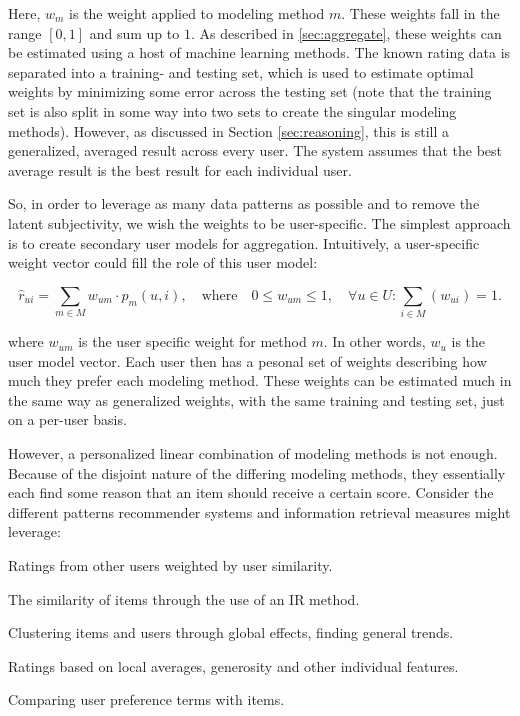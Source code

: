 Here, $w_m$ is the weight applied to modeling method $m$. These weights fall in the range $[0,1]$ and sum up to $1$.
As described in \ref{sec:aggregate}, these weights can be estimated using a host of machine learning methods.
The known rating data is separated into a training- and testing set, which is used to estimate optimal weights
by minimizing some error across the testing set 
(note that the training set is also split in some way into two sets to create the singular modeling methods).
However, as discussed in Section \ref{sec:reasoning},
this is still a generalized, averaged result across every user. 
The system assumes that the best average result is the best result for each individual user.

So, in order to leverage as many data patterns as possible and to remove the latent subjectivity,
we wish the weights to be user-specific. The simplest approach is to create secondary user models for aggregation.
Intuitively, a user-specific weight vector could fill the role of this user model:

\begin{equation*}
  \hat{r}_{ui} = \sum_{m \in M} w_{um} \cdot p_m(u,i),
  \quad \text{where} \quad 0 \leq w_{um} \leq 1, \quad \forall u \in U: \sum_{i \in M} (w_{ui}) = 1.
\end{equation*}

where $w_{um}$ is the user specific weight for method $m$. In other words, $w_{u}$ is the user model vector.
Each user then has a pesonal set of weights describing how much they prefer each modeling method.
These weights can be estimated much in the same way as generalized weights, 
with the same training and testing set, just on a per-user basis.

However, a personalized linear combination of modeling methods is not enough.
Because of the disjoint nature of the differing modeling methods, 
they essentially each find some reason that an item should receive a certain score.
Consider the different patterns recommender systems and information retrieval measures might leverage:

\begin{itemize*}
  \item Ratings from other users weighted by user similarity.
  \item The similarity of items through the use of an IR method.
  \item Clustering items and users through global effects, finding general trends.
  \item Ratings based on local averages, generosity and other individual features.
  \item Comparing user preference terms with items.
\end{itemize*}

